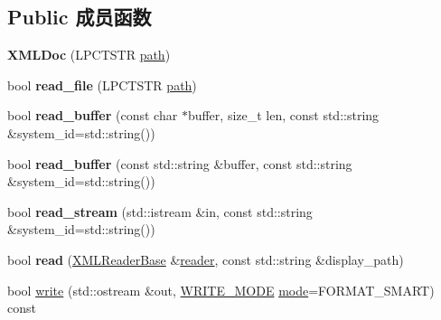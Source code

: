 \subsection*{Public 成员函数}
\begin{DoxyCompactItemize}
\item 
\mbox{\label{struct_x_m_l_storage_1_1_x_m_l_doc_abe5df81643a952575d69cc99cab7d7d4}} 
{\bfseries X\+M\+L\+Doc} (L\+P\+C\+T\+S\+TR \hyperlink{structpath}{path})
\item 
\mbox{\label{struct_x_m_l_storage_1_1_x_m_l_doc_a5af4fe3f36215c892ed83c64d5759bb1}} 
bool {\bfseries read\+\_\+file} (L\+P\+C\+T\+S\+TR \hyperlink{structpath}{path})
\item 
\mbox{\label{struct_x_m_l_storage_1_1_x_m_l_doc_a2139b33dea6f2193e5ec3b766ff7547a}} 
bool {\bfseries read\+\_\+buffer} (const char $\ast$buffer, size\+\_\+t len, const std\+::string \&system\+\_\+id=std\+::string())
\item 
\mbox{\label{struct_x_m_l_storage_1_1_x_m_l_doc_a24b96ef1dfd60ec83fd1239e0ddfe5d0}} 
bool {\bfseries read\+\_\+buffer} (const std\+::string \&buffer, const std\+::string \&system\+\_\+id=std\+::string())
\item 
\mbox{\label{struct_x_m_l_storage_1_1_x_m_l_doc_abf7b06bddee0d8e86246458a6af0bba5}} 
bool {\bfseries read\+\_\+stream} (std\+::istream \&in, const std\+::string \&system\+\_\+id=std\+::string())
\item 
\mbox{\label{struct_x_m_l_storage_1_1_x_m_l_doc_a34388d8706ef626d68a11fd681c15ab4}} 
bool {\bfseries read} (\hyperlink{struct_x_m_l_storage_1_1_x_m_l_reader_base}{X\+M\+L\+Reader\+Base} \&\hyperlink{structreader}{reader}, const std\+::string \&display\+\_\+path)
\item 
\mbox{\label{struct_x_m_l_storage_1_1_x_m_l_doc_a577516b5e56eb523c516b65a5c756a19}} 
bool \hyperlink{struct_x_m_l_storage_1_1_x_m_l_doc_a577516b5e56eb523c516b65a5c756a19}{write} (std\+::ostream \&out, \hyperlink{xmlstorage_8h_a384e8ed47866fe059e3ad92b8d89d462}{W\+R\+I\+T\+E\+\_\+\+M\+O\+DE} \hyperlink{interfacevoid}{mode}=F\+O\+R\+M\+A\+T\+\_\+\+S\+M\+A\+RT) const

\end{DoxyCompactItemize}
